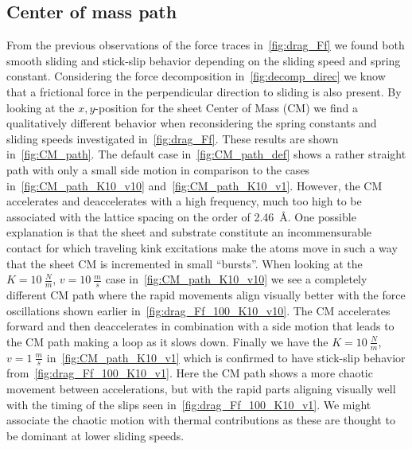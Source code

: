 \subsection{Center of mass path}
From the previous observations of the force traces in~\cref{fig:drag_Ff} we found both smooth sliding and stick-slip behavior depending on the sliding speed and spring constant. Considering the force
decomposition in~\cref{fig:decomp_direc} we know that a frictional force in
the perpendicular direction to sliding is also present. By looking at the
$x,y$-position for the sheet Center of Mass (\acrshort{CM}) we find a qualitatively different behavior when reconsidering the spring constants and sliding speeds investigated in~\cref{fig:drag_Ff}. These results are shown in~\cref{fig:CM_path}. The default case in~\cref{fig:CM_path_def} shows a rather straight path with
only a small side motion in comparison to the cases in~\cref{fig:CM_path_K10_v10} and~\cref{fig:CM_path_K10_v1}. However, the \acrshort{CM} accelerates and deaccelerates with a high frequency, much too high
to be associated with the lattice spacing on the order of \SI{2.46}{Å}. One possible explanation is that the sheet and substrate
constitute an incommensurable contact for which traveling kink excitations make
the atoms move in such a way that the sheet \acrshort{CM} is incremented in small ``bursts''. When looking at the $K = \SI{10}{\frac{N}{m}}$, $v =
\SI{10}{\frac{m}{s}}$ case in~\cref{fig:CM_path_K10_v10} we see a completely
different \acrshort{CM} path where the rapid movements align visually better with
the force oscillations shown earlier in~\cref{fig:drag_Ff_100_K10_v10}. The
\acrshort{CM} accelerates forward and then deaccelerates in combination with a
side motion that leads to the \acrshort{CM} path making a loop as it slows down.
Finally we have the $K = \SI{10}{\frac{N}{m}}$, $v = \SI{1}{\frac{m}{s}}$ in~\cref{fig:CM_path_K10_v1} which is confirmed to have stick-slip behavior from~\cref{fig:drag_Ff_100_K10_v1}. Here the \acrshort{CM} path shows a more chaotic
movement between accelerations, but with the rapid parts aligning visually well with the timing of the slips seen in~\cref{fig:drag_Ff_100_K10_v1}. We might associate the chaotic motion with thermal contributions as these are thought to be dominant at lower sliding speeds.  


